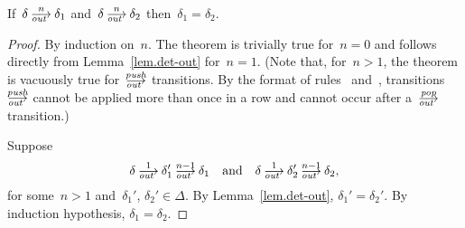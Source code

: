 
\begin{theorem}\label{thm.det-out-pop-n}
  If~$\delta\out[n]\delta_1$ and~$\delta\out[n]\delta_2$
  then~$\delta_1=\delta_2$.
\end{theorem}
\begin{proof}
  By induction on~$n$.
  The theorem is trivially true for~$n=0$ and follows directly from
  Lemma~\ref{lem.det-out} for~$n=1$.  (Note that, for~$n>1$, the theorem is
  vacuously true for~$\outpush$ transitions.  By the format of
  rules~ and~, transitions~$\outpush$ cannot be applied more
  than once in a row and cannot occur after a~$\outpop$ transition.)

  Suppose
  \[
    \delta\out[1]\delta_1'\out[n-1]\delta_1
    \quad\text{and}\quad
    \delta\out[1]\delta_2'\out[n-1]\delta_2,
  \]
  for some~$n>1$ and~$\delta_1'$, $\delta_2'\in\Delta$.
  By Lemma~\ref{lem.det-out}, $\delta_1'=\delta_2'$.  By induction
  hypothesis, $\delta_1=\delta_2$.\qedhere
\end{proof}

